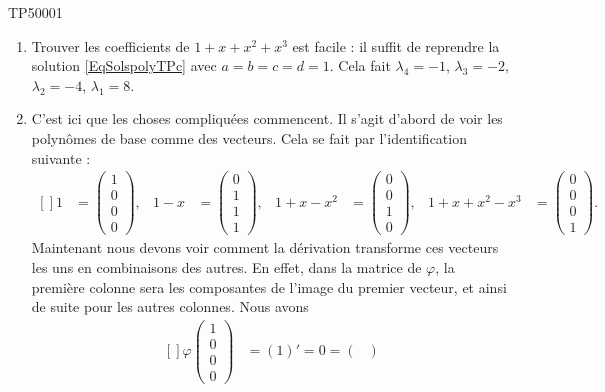 \begin{corrige}{TP50001}
\begin{enumerate}
		\item
			Trouver les coefficients de $1+x+x^2+x^3$ est facile : il suffit de reprendre la solution \eqref{EqSolspolyTPc} avec $a=b=c=d=1$. Cela fait $\lambda_4=-1$, $\lambda_3=-2$, $\lambda_2=-4$, $\lambda_1=8$.

		\item
			C'est ici que les choses compliquées commencent. Il s'agit d'abord de voir les polynômes de base comme des vecteurs. Cela se fait par l'identification suivante :
			\begin{equation}
				\begin{aligned}[]
					1&=\begin{pmatrix}
						1	\\ 
						0	\\ 
						0	\\ 
						0	
					\end{pmatrix},
					&1-x&=\begin{pmatrix}
						0	\\ 
						1	\\ 
						1	\\ 
						1	
					\end{pmatrix},
					&1+x-x^2&=\begin{pmatrix}
						0	\\ 
						0	\\ 
						1	\\ 
						0	
					\end{pmatrix},
					&1+x+x^2-x^3&=\begin{pmatrix}
						0	\\ 
						0	\\ 
						0	\\ 
						1	
					\end{pmatrix}.
				\end{aligned}
			\end{equation}
			Maintenant nous devons voir comment la dérivation transforme ces vecteurs les uns en combinaisons des autres. En effet, dans la matrice de $\varphi$, la première colonne sera les composantes de l'image du premier vecteur, et ainsi de suite pour les autres colonnes. Nous avons
			\begin{equation}
				\begin{aligned}[]
					\varphi\begin{pmatrix}
						1	\\ 
						0	\\ 
						0	\\ 
						0	
					\end{pmatrix}&=(1)'=0=\begin{pmatrix}

\end{pmatrix}
\end{aligned}
\end{equation}
\end{enumerate}
\end{corrige}
